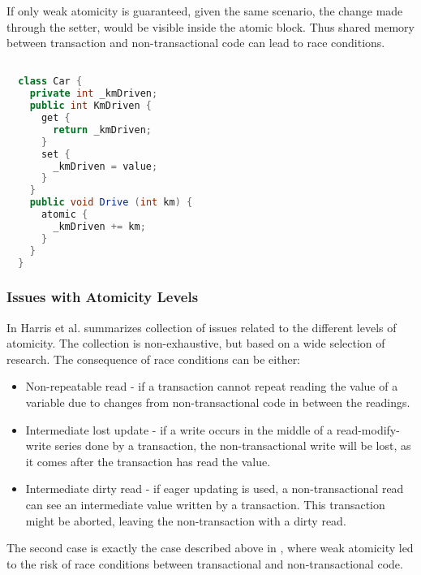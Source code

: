 If only weak atomicity is guaranteed, given the same scenario, the change made through the setter, would be visible inside the atomic block. Thus shared memory between transaction and non-transactional code can lead to race conditions.
%

\begin{lstlisting}[label=lst:atomicity,
  caption={Level of Atomicity},
  language=Java,  
  showspaces=false,
  showtabs=false,
  breaklines=true,
  showstringspaces=false,
  breakatwhitespace=true,
  commentstyle=\color{greencomments},
  keywordstyle=\color{bluekeywords},
  stringstyle=\color{redstrings},
  morekeywords={atomic, retry, orElse, var, get, set}]  % Start your code-block

  class Car {
    private int _kmDriven;
    public int KmDriven {
      get {
        return _kmDriven;
      }
      set {
        _kmDriven = value;
      }
    }
    public void Drive (int km) {
      atomic {
        _kmDriven += km;
      }
    }
  }
\end{lstlisting}

\subsubsection{Issues with Atomicity Levels}
In \cite[p. 30-35]{harris2010transactional} Harris et al. summarizes collection of issues related to the different levels of atomicity. The collection is non-exhaustive, but based on a wide selection of research. The consequence of race conditions can be either:
\begin{itemize}
	\item Non-repeatable read - if a transaction cannot repeat reading the value of a variable due to changes from non-transactional code in between the readings.
	\item Intermediate lost update - if a write occurs in the middle of a read-modify-write series done by a transaction, the non-transactional write will be lost, as it comes after the transaction has read the value.
	\item Intermediate dirty read - if eager updating\cite[p. 53]{dpt907e14trending} is used, a non-transactional read can see an intermediate value written by a transaction. This transaction might be aborted, leaving the non-transaction with a dirty read.
\end{itemize}
The second case is exactly the case described above in , where weak atomicity led to the risk of race conditions between transactional and non-transactional code. 

